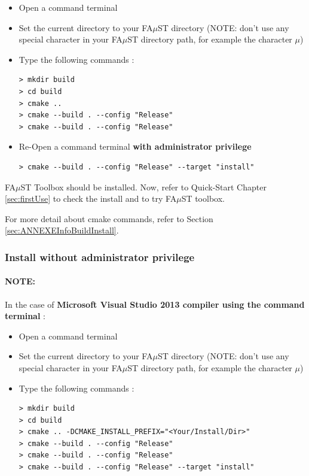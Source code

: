\begin{itemize}
\item Open a command terminal
\item Set the current directory to your FA$\mu$ST directory (NOTE: don't use any special character in your FA$\mu$ST directory path, for example the character $\mu$)
\item Type the following commands : 

\begin{lstlisting}
> mkdir build
> cd build
> cmake ..
> cmake --build . --config "Release"
> cmake --build . --config "Release"
\end{lstlisting}
\item Re-Open a command terminal \textbf{with administrator privilege} 
\begin{lstlisting}
> cmake --build . --config "Release" --target "install"
\end{lstlisting}
\end{itemize}

FA$\mu$ST Toolbox should be installed. Now, refer to Quick-Start Chapter \ref{sec:firstUse} to check the install and to try FA$\mu$ST toolbox.

For more detail about cmake commands, refer to Section \ref{sec:ANNEXEInfoBuildInstall}.

\subsubsection{Install without administrator privilege}
\label{sec:NoAdminWinVisualStudioTerminalBasicInstall}

\paragraph{NOTE:}In the case of \textbf{Microsoft Visual Studio 2013 compiler using the command terminal} :

\begin{itemize}
\item Open a command terminal
\item Set the current directory to your FA$\mu$ST directory (NOTE: don't use any special character in your FA$\mu$ST directory path, for example the character $\mu$)
\item Type the following commands : 

\begin{lstlisting}
> mkdir build
> cd build
> cmake .. -DCMAKE_INSTALL_PREFIX="<Your/Install/Dir>" 
> cmake --build . --config "Release"
> cmake --build . --config "Release"
> cmake --build . --config "Release" --target "install"
\end{lstlisting}
\end{itemize}

